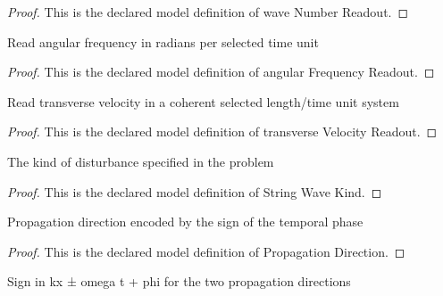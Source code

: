 \begin{proof}
  This is the declared model definition of wave Number Readout.
\end{proof}
\begin{definition}
  \label{def:physics:phyx-mini-0300:phyxminiproblems-problemphyxmini0300-angularfrequencyreadout}
  Read angular frequency in radians per selected time unit
\end{definition}
\begin{proof}
  This is the declared model definition of angular Frequency Readout.
\end{proof}
\begin{definition}
  \label{def:physics:phyx-mini-0300:phyxminiproblems-problemphyxmini0300-transversevelocityreadout}
  Read transverse velocity in a coherent selected length/time unit system
\end{definition}
\begin{proof}
  This is the declared model definition of transverse Velocity Readout.
\end{proof}
\begin{definition}
  \label{def:physics:phyx-mini-0300:phyxminiproblems-problemphyxmini0300-stringwavekind}
  The kind of disturbance specified in the problem
\end{definition}
\begin{proof}
  This is the declared model definition of String Wave Kind.
\end{proof}
\begin{definition}
  \label{def:physics:phyx-mini-0300:phyxminiproblems-problemphyxmini0300-propagationdirection}
  Propagation direction encoded by the sign of the temporal phase
\end{definition}
\begin{proof}
  This is the declared model definition of Propagation Direction.
\end{proof}
\begin{definition}
  \label{def:physics:phyx-mini-0300:phyxminiproblems-problemphyxmini0300-temporalphasesign}
  Sign in kx ± omega t + phi for the two propagation directions
\end{definition}
